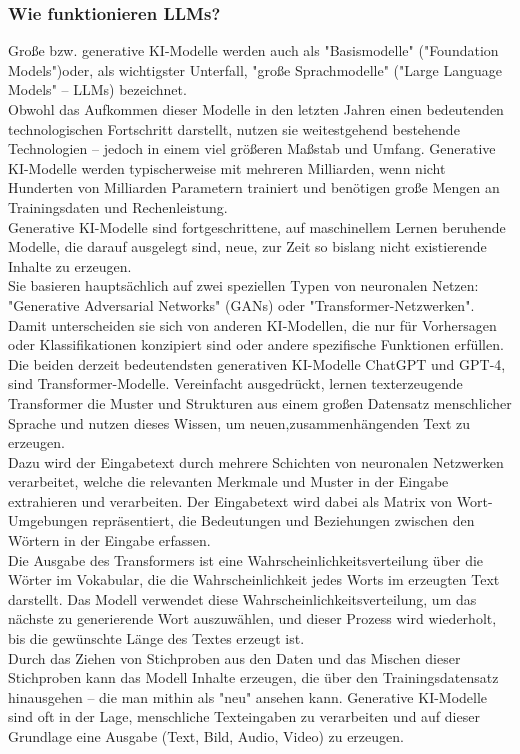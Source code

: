 \documentclass[12pt]{article}
\begin{document}
\subsubsection{Wie funktionieren LLMs?}
Große bzw. generative KI-Modelle werden auch als "Basismodelle" ("Foundation Models")oder, als wichtigster Unterfall, "große Sprachmodelle" ("Large Language Models" – LLMs) bezeichnet.\\
Obwohl das Aufkommen dieser Modelle in den letzten Jahren einen bedeutenden
technologischen Fortschritt darstellt, nutzen sie weitestgehend bestehende Technologien – jedoch in einem viel größeren Maßstab und Umfang. Generative KI-Modelle werden typischerweise mit mehreren Milliarden, wenn nicht Hunderten von Milliarden Parametern trainiert und benötigen große Mengen an Trainingsdaten und Rechenleistung.\\
Generative KI-Modelle sind fortgeschrittene, auf maschinellem Lernen beruhende Modelle, die darauf ausgelegt sind, neue, zur Zeit so bislang nicht existierende Inhalte zu erzeugen.\\
Sie basieren hauptsächlich auf zwei speziellen Typen von neuronalen Netzen: "Generative Adversarial Networks" (GANs) oder "Transformer-Netzwerken".\\
Damit unterscheiden sie sich von anderen KI-Modellen, die nur für Vorhersagen oder Klassifikationen konzipiert sind oder andere spezifische Funktionen erfüllen.
Die beiden derzeit bedeutendsten generativen KI-Modelle ChatGPT  und GPT-4, sind Transformer-Modelle. Vereinfacht ausgedrückt, lernen texterzeugende Transformer die Muster und Strukturen aus einem großen Datensatz menschlicher Sprache und nutzen dieses Wissen, um neuen,zusammenhängenden Text zu erzeugen.\\
%
Dazu wird der Eingabetext durch mehrere Schichten von neuronalen Netzwerken verarbeitet, welche die relevanten Merkmale und Muster in der Eingabe extrahieren und verarbeiten. Der Eingabetext wird dabei als Matrix von Wort-Umgebungen repräsentiert, die Bedeutungen und Beziehungen zwischen den Wörtern in der Eingabe erfassen.\\
Die Ausgabe des Transformers ist eine Wahrscheinlichkeitsverteilung über die Wörter im
Vokabular, die die Wahrscheinlichkeit jedes Worts im erzeugten Text darstellt. Das Modell verwendet diese Wahrscheinlichkeitsverteilung, um das nächste zu generierende Wort auszuwählen, und dieser Prozess wird wiederholt, bis die gewünschte Länge des Textes erzeugt ist.\\
%
Durch das Ziehen von Stichproben aus den Daten und das Mischen dieser Stichproben kann das Modell Inhalte erzeugen, die über den Trainingsdatensatz hinausgehen – die man mithin als "neu" ansehen kann. Generative KI-Modelle sind oft in der Lage, menschliche Texteingaben zu verarbeiten und auf dieser Grundlage eine Ausgabe (Text, Bild, Audio, Video) zu erzeugen.\\
\end{document}
